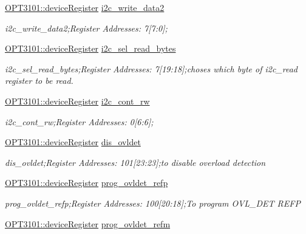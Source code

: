 \begin{DoxyCompactItemize}
\mbox{\hyperlink{class_o_p_t3101_1_1device_register}{O\+P\+T3101\+::device\+Register}} \mbox{\hyperlink{class_o_p_t3101_1_1registers_a7405a3e25e7f825958b7d271cb183d56}{i2c\+\_\+write\+\_\+data2}}
\begin{DoxyCompactList}\small\item\em i2c\+\_\+write\+\_\+data2;Register Addresses\+: 7\mbox{[}7\+:0\mbox{]}; \end{DoxyCompactList}\item 
\mbox{\hyperlink{class_o_p_t3101_1_1device_register}{O\+P\+T3101\+::device\+Register}} \mbox{\hyperlink{class_o_p_t3101_1_1registers_ae3cafcbc6dbd88c078e92f49b54d9407}{i2c\+\_\+sel\+\_\+read\+\_\+bytes}}
\begin{DoxyCompactList}\small\item\em i2c\+\_\+sel\+\_\+read\+\_\+bytes;Register Addresses\+: 7\mbox{[}19\+:18\mbox{]};choses which byte of i2c\+\_\+read register to be read. \end{DoxyCompactList}\item 
\mbox{\hyperlink{class_o_p_t3101_1_1device_register}{O\+P\+T3101\+::device\+Register}} \mbox{\hyperlink{class_o_p_t3101_1_1registers_adbdf84416c91cc053a4b1a62ed6bea9e}{i2c\+\_\+cont\+\_\+rw}}
\begin{DoxyCompactList}\small\item\em i2c\+\_\+cont\+\_\+rw;Register Addresses\+: 0\mbox{[}6\+:6\mbox{]}; \end{DoxyCompactList}\item 
\mbox{\hyperlink{class_o_p_t3101_1_1device_register}{O\+P\+T3101\+::device\+Register}} \mbox{\hyperlink{class_o_p_t3101_1_1registers_a8f0c7bef103e7aa4efd1c18239fbef37}{dis\+\_\+ovldet}}
\begin{DoxyCompactList}\small\item\em dis\+\_\+ovldet;Register Addresses\+: 101\mbox{[}23\+:23\mbox{]};to disable overload detection \end{DoxyCompactList}\item 
\mbox{\hyperlink{class_o_p_t3101_1_1device_register}{O\+P\+T3101\+::device\+Register}} \mbox{\hyperlink{class_o_p_t3101_1_1registers_a5a2861d0fdb55bb7b6fb2460e1e043df}{prog\+\_\+ovldet\+\_\+refp}}
\begin{DoxyCompactList}\small\item\em prog\+\_\+ovldet\+\_\+refp;Register Addresses\+: 100\mbox{[}20\+:18\mbox{]};To program O\+V\+L\+\_\+\+D\+ET R\+E\+FP \end{DoxyCompactList}\item 
\mbox{\hyperlink{class_o_p_t3101_1_1device_register}{O\+P\+T3101\+::device\+Register}} \mbox{\hyperlink{class_o_p_t3101_1_1registers_a4ae7fee3fc50dfe0b8db37304a02adf4}{prog\+\_\+ovldet\+\_\+refm}}

\end{DoxyCompactItemize}
